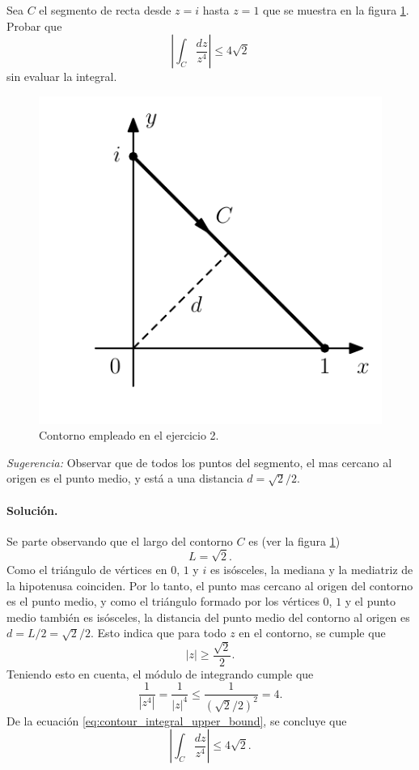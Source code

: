 \documentclass[a4paper]{report}
\begin{document}
Sea \(C\) el segmento de recta desde \(z=i\) hasta \(z=1\) que se muestra en la figura \ref{fig:exercise_47_02}. Probar que 
\[
 \left|\int_C\frac{dz}{z^4}\right|\leq4\sqrt{2}
\]
sin evaluar la integral.
\begin{figure}[!htb]
 \begin{minipage}[c]{0.35\textwidth}
   \includegraphics[width=\textwidth]{figuras/exercise_47_02.pdf}
 \end{minipage}\hfill
 \begin{minipage}[c]{0.55\textwidth}
  \caption{
       Contorno empleado en el ejercicio 2.
  }\label{fig:exercise_47_02}
 \end{minipage}
\end{figure}

\emph{Sugerencia:} Observar que de todos los puntos del segmento, el mas cercano al origen es el punto medio, y está a una distancia \(d=\sqrt{2}/2\).

\paragraph{Solución.} Se parte observando que el largo del contorno \(C\) es (ver la figura \ref{fig:exercise_47_02})
\[
 L=\sqrt{2}.
\]
Como el triángulo de vértices en \(0\), \(1\) y \(i\) es isósceles, la mediana y la mediatriz de la hipotenusa coinciden. Por lo tanto, el punto mas cercano al origen del contorno es el punto medio, y como el triángulo formado por los vértices \(0\), \(1\) y el punto medio también es isósceles, la distancia del punto medio del contorno al origen es \(d=L/2=\sqrt{2}/2\). Esto indica que para todo \(z\) en el contorno, se cumple que 
\[
 |z|\geq\frac{\sqrt{2}}{2}.
\]
Teniendo esto en cuenta, el módulo de integrando cumple que 
\[
 \frac{1}{|z^4|}=\frac{1}{|z|^4}\leq\frac{1}{(\sqrt{2}/2)^2}=4.
\]
De la ecuación \ref{eq:contour_integral_upper_bound}, se concluye que 
\[
 \left|\int_C\frac{dz}{z^4}\right|\leq4\sqrt{2}.
\]
\end{document}
